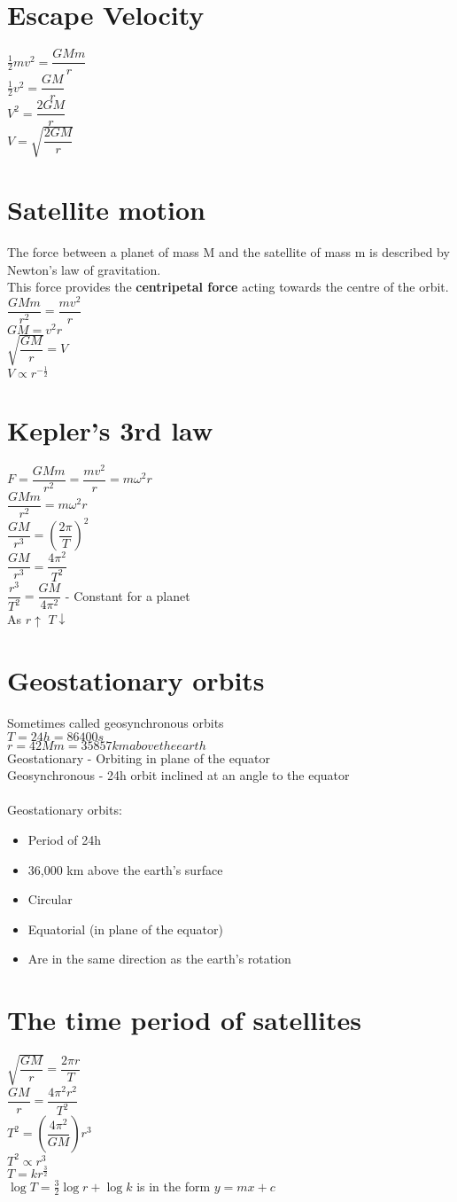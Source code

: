 \documentclass{article}[18pt]
\begin{document}
\section{Escape Velocity}
$\frac{1}{2}mv^2=\dfrac{GMm}{r}$\\
$\frac{1}{2}v^2=\dfrac{GM}{r}$\\
$V^2=\dfrac{2GM}{r}$\\
$V=\sqrt{\dfrac{2GM}{r}}$
\section{Satellite motion}
The force between a planet of mass M and the satellite of mass m is described by Newton's law of gravitation.\\
This force provides the \textbf{centripetal force} acting towards the centre of the orbit.\\
$\dfrac{GMm}{r^2}=\dfrac{mv^2}{r}$\\
$GM=v^2r$\\
$\sqrt{\dfrac{GM}{r}}=V$\\
$V\propto r^{-\frac{1}{2}}$
\section{Kepler's 3rd law}
$F=\dfrac{GMm}{r^2}=\dfrac{mv^2}{r}=m\omega^2r$\\
$\dfrac{GMm}{r^2}=m\omega^2r$\\
$\dfrac{GM}{r^3}=(\dfrac{2\pi}{T})^2$\\
$\dfrac{GM}{r^3}=\dfrac{4\pi^2}{T^2}$\\
$\dfrac{r^3}{T^2}=\dfrac{GM}{4\pi^2}$ - Constant for a planet\\
As $r\uparrow$ $T\downarrow$\\
\section{Geostationary orbits}
Sometimes called geosynchronous orbits\\
$T=24h=86400s$\\
$r=42Mm=35857km above the earth$\\
Geostationary - Orbiting in plane of the equator\\
Geosynchronous - 24h orbit inclined at an angle to the equator\\
\\
Geostationary orbits:
\begin{itemize}
\item Period of 24h
\item 36,000 km above the earth's surface
\item Circular
\item Equatorial (in plane of the equator)
\item Are in the same direction as the earth's rotation
\end{itemize}
\section{The time period of satellites}
$\sqrt{\dfrac{GM}{r}}=\dfrac{2\pi r}{T}$\\
$\dfrac{GM}{r}=\dfrac{4\pi^2r^2}{T^2}$\\
$T^2=(\dfrac{4\pi^2}{GM})r^3$\\
$T^2\propto r^3$\\
$T=kr^{\frac{3}{2}}$\\
$\log T=\frac{3}{2}\log r+\log k$ is in the form $y=mx+c$
\end{document}

